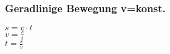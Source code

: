 \subsubsection{Geradlinige Bewegung v=konst.} 
\begin{minipage}{0.45\textwidth} 
$ s = v\cdot t $\\ 
$ v = \frac{s}{t} $\\ 
$ t = \frac{s}{v} $\\ 
\end{minipage} 
\begin{minipage}{0.45\textwidth} 
 
\end{minipage} 
